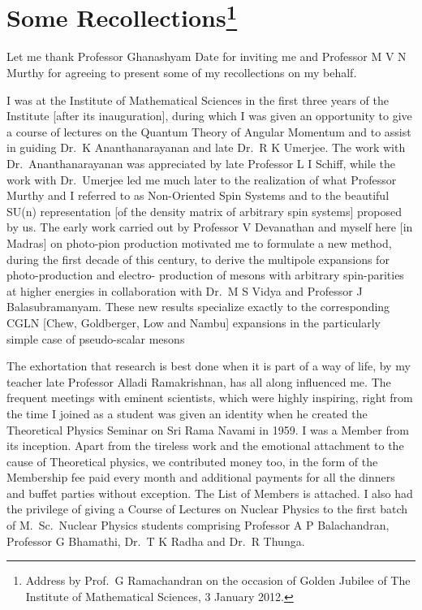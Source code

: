 \chapter[Some Recollections]{Some Recollections\footnote[*]{Address by Prof.\ G Ramachandran on the occasion of Golden Jubilee of The Institute of Mathematical Sciences, 3 January 2012.}}\label{chap2}

\medskip

Let me thank Professor Ghanashyam Date for inviting me and Professor M V N Murthy
for agreeing to present some of my recollections on my behalf.

I was at the Institute of Mathematical Sciences in the first three years of the
Institute [after its inauguration], during which I was given an opportunity to give
a course of lectures on the Quantum Theory of Angular Momentum and to assist
in guiding Dr.\ K Ananthanarayanan and late Dr.\ R K Umerjee. The work with Dr.\ 
Ananthanarayanan was appreciated by late Professor L I Schiff, while the work with
Dr.\ Umerjee led me much later to the realization of what Professor Murthy and I
referred to as Non-Oriented Spin Systems and to the beautiful SU(n) representation
[of the density matrix of arbitrary spin systems] proposed by us. The early work
carried out by Professor V Devanathan and myself here [in Madras] on photo-pion
production motivated me to formulate a new method, during the first decade of
this century, to derive the multipole expansions for photo-production and electro-
production of mesons with arbitrary spin-parities at higher energies in collaboration
with Dr.\ M S Vidya and Professor J Balasubramanyam. These new results specialize
exactly to the corresponding CGLN [Chew, Goldberger, Low and Nambu] expansions
in the particularly simple case of pseudo-scalar mesons

The exhortation that research is best done when it is part of a way of life, by
my teacher late Professor Alladi Ramakrishnan, has all along influenced me. The
frequent meetings with eminent scientists, which were highly inspiring, right from
the time I joined as a student was given an identity when he created the Theoretical
Physics Seminar on Sri Rama Navami in 1959. I was a Member from its inception.
Apart from the tireless work and the emotional attachment to the cause of\break 
Theoretical physics, we contributed money too, in the form of the Membership fee paid every
month and additional payments for all the dinners and buffet parties without exception. 
The List of Members is attached. I also had the privilege of giving a Course
of Lectures on Nuclear Physics to the first batch of M.\ Sc.\ Nuclear Physics students
comprising Professor A P Balachandran, Professor G Bhamathi, Dr.\ T K Radha and
Dr.\ R Thunga.

